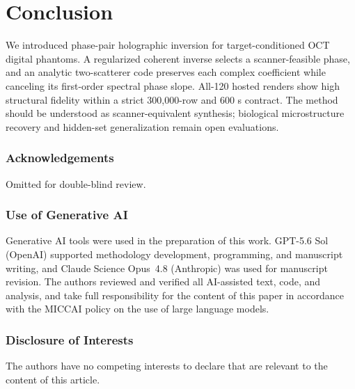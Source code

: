 \documentclass[runningheads]{llncs}
\newcommand{\method}{phase-pair holographic inversion}
\begin{document}
\section{Conclusion}

We introduced \method{} for target-conditioned OCT digital phantoms. A
regularized coherent inverse selects a scanner-feasible phase, and an analytic
two-scatterer code preserves each complex coefficient while canceling its
first-order spectral phase slope. All-120 hosted renders show high structural
fidelity within a strict 300,000-row and 600 s contract. The method should be
understood as scanner-equivalent synthesis; biological microstructure recovery
and hidden-set generalization remain open evaluations.

\begin{credits}
\subsubsection{Acknowledgements} Omitted for double-blind review.
\subsubsection{Use of Generative AI} Generative AI tools were used in the
preparation of this work. GPT-5.6 Sol (OpenAI) supported methodology
development, programming, and manuscript writing, and Claude Science Opus~4.8
(Anthropic) was used for manuscript revision. The authors reviewed and verified
all AI-assisted text, code, and analysis, and take full responsibility for the
content of this paper in accordance with the MICCAI policy on the use of large
language models.
\subsubsection{Disclosure of Interests} The authors have no competing interests
to declare that are relevant to the content of this article.
\end{credits}



\end{document}
